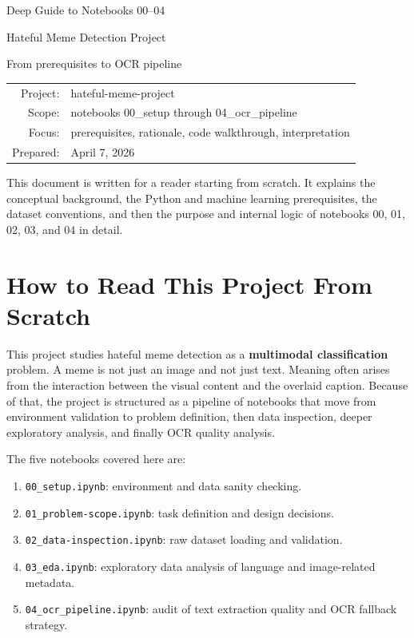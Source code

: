 \documentclass[11pt,a4paper]{report}
\begin{document}
\begin{titlepage}
\centering
{\Huge Deep Guide to Notebooks 00--04 \par}
\vspace{0.8cm}
{\Large Hateful Meme Detection Project \par}
\vspace{0.6cm}
{\large From prerequisites to OCR pipeline \par}
\vfill
\begin{tabular}{rl}
Project:& hateful-meme-project \\
Scope:& notebooks 00\_setup through 04\_ocr\_pipeline \\
Focus:& prerequisites, rationale, code walkthrough, interpretation \\
Prepared:& April 7, 2026
\end{tabular}
\vfill
\begin{keyidea}
This document is written for a reader starting from scratch. It explains the conceptual background, the Python and machine learning prerequisites, the dataset conventions, and then the purpose and internal logic of notebooks 00, 01, 02, 03, and 04 in detail.
\end{keyidea}
\end{titlepage}

\tableofcontents

\chapter{How to Read This Project From Scratch}

This project studies hateful meme detection as a \textbf{multimodal classification} problem. A meme is not just an image and not just text. Meaning often arises from the interaction between the visual content and the overlaid caption. Because of that, the project is structured as a pipeline of notebooks that move from environment validation to problem definition, then data inspection, deeper exploratory analysis, and finally OCR quality analysis.

The five notebooks covered here are:

\begin{enumerate}[label=\arabic*.]
\item \texttt{00\_setup.ipynb}: environment and data sanity checking.
\item \texttt{01\_problem-scope.ipynb}: task definition and design decisions.
\item \texttt{02\_data-inspection.ipynb}: raw dataset loading and validation.
\item \texttt{03\_eda.ipynb}: exploratory data analysis of language and image-related metadata.
\item \texttt{04\_ocr\_pipeline.ipynb}: audit of text extraction quality and OCR fallback strategy.
\end{enumerate}
\end{document}
